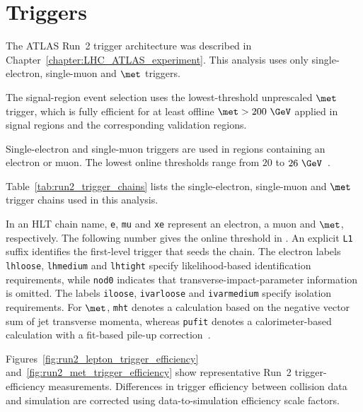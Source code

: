 \section{Triggers}
\label{sec:analysis_triggers}

The ATLAS Run~2 trigger architecture was described in Chapter~\ref{chapter:LHC_ATLAS_experiment}.
This analysis uses only single-electron, single-muon and $\met$ triggers.

The signal-region event selection uses the lowest-threshold unprescaled $\met$ trigger, which is fully efficient for at least offline $\met>200~\GeV$ applied in signal regions and the corresponding validation regions.

Single-electron and single-muon triggers are used in regions containing an electron or muon.
The lowest online thresholds range from $20$ to $26~\GeV$~\cite{ATLASElectronTriggerRun2,ATLASMuonTriggerRun2}.

Table~\ref{tab:run2_trigger_chains} lists the single-electron, single-muon and $\met$ trigger chains used in this analysis.

In an HLT chain name, \texttt{e}, \texttt{mu} and \texttt{xe} represent an electron, a muon and $\met$, respectively. The following number gives the online threshold in \GeV.
An explicit \texttt{L1} suffix identifies the first-level trigger that seeds the chain.
The electron labels \texttt{lhloose}, \texttt{lhmedium} and \texttt{lhtight} specify likelihood-based identification requirements, while \texttt{nod0} indicates that transverse-impact-parameter information is omitted.
The labels \texttt{iloose}, \texttt{ivarloose} and \texttt{ivarmedium} specify isolation requirements.
For $\met$, \texttt{mht} denotes a calculation based on the negative vector sum of jet transverse momenta, whereas \texttt{pufit} denotes a calorimeter-based calculation with a fit-based pile-up correction~\cite{ATLASMETTriggerRun2}.

Figures~\ref{fig:run2_lepton_trigger_efficiency} and~\ref{fig:run2_met_trigger_efficiency} show representative Run~2 trigger-efficiency measurements.
Differences in trigger efficiency between collision data and simulation are corrected using data-to-simulation efficiency scale factors.


